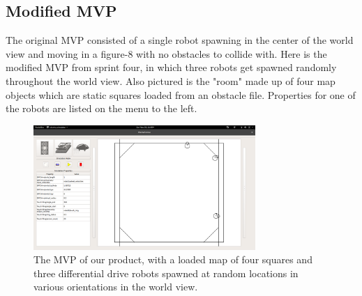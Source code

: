\subsection{Modified MVP}

The original MVP consisted of a single robot spawning in the center of the world view and moving in a figure-8 with no obstacles to collide with. Here is the modified MVP from sprint four, in which three robots get spawned randomly throughout the world view. Also pictured is the "room" made up of four map objects which are static squares loaded from an obstacle file. Properties for one of the robots are listed on the menu to the left.

\begin{figure}[!htb]
	\begin{center}
		\includegraphics[width=0.75\textwidth]{./Images/Sprint3_hasBox_originalUI}
	\end{center}
	\caption{The MVP of our product, with a loaded map of four squares and three differential drive robots spawned at random locations in various orientations in the world view. \label{mvp}}
\end{figure}